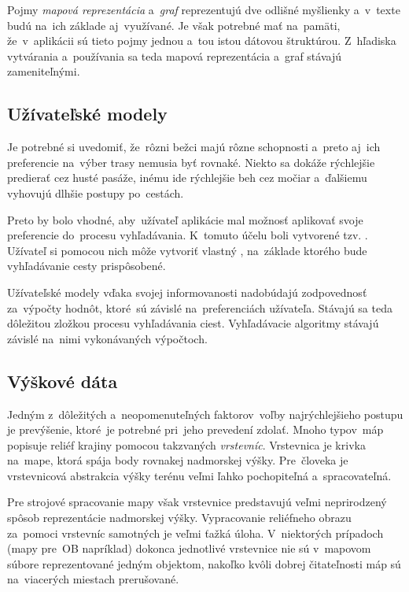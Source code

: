 Pojmy \textit{mapová reprezentácia} a~\textit{graf} reprezentujú dve odlišné myšlienky a~v~texte budú na~ich základe aj~využívané. Je však potrebné mať na~pamäti, že~v~aplikácii sú tieto pojmy jednou a~tou istou dátovou štruktúrou. Z~hľadiska vytvárania a~používania sa teda mapová reprezentácia a~graf stávajú zameniteľnými.

\subsection{Užívateľské modely}\label{uzivatelske_modely}

Je potrebné si uvedomiť, že~rôzni bežci majú rôzne schopnosti a~preto aj~ich preferencie na~výber trasy nemusia byť rovnaké. Niekto sa dokáže rýchlejšie predierať cez husté pasáže, inému ide rýchlejšie beh cez močiar a~ďalšiemu vyhovujú dlhšie postupy po~cestách. 

Preto by bolo vhodné, aby~užívateľ aplikácie mal možnosť aplikovať svoje preferencie do~procesu vyhľadávania. K~tomuto účelu boli vytvorené tzv. . Užívateľ si pomocou nich môže vytvoriť vlastný , na~základe ktorého bude vyhľadávanie cesty prispôsobené.

Užívateľské modely vďaka svojej informovanosti nadobúdajú zodpovednosť za~výpočty hodnôt, ktoré~sú závislé na~preferenciách užívateľa. Stávajú sa teda dôležitou zložkou procesu vyhľadávania ciest. Vyhľadávacie algoritmy stávajú závislé na~nimi vykonávaných výpočtoch.

\subsection{Výškové dáta}\label{vyskove_data}

Jedným z~dôležitých a~neopomenuteľných faktorov~voľby najrýchlejšieho postupu je prevýšenie, ktoré~je potrebné pri~jeho prevedení zdolať. Mnoho typov~máp popisuje reliéf krajiny pomocou takzvaných \textit{vrstevníc}. Vrstevnica je krivka na~mape, ktorá spája body rovnakej nadmorskej výšky. Pre~človeka je vrstevnicová abstrakcia výšky terénu veľmi ľahko pochopiteľná a~spracovateľná.

Pre strojové spracovanie mapy však vrstevnice predstavujú veľmi neprirodzený spôsob reprezentácie nadmorskej výšky. Vypracovanie reliéfneho obrazu za~pomoci vrstevníc samotných je veľmi ťažká úloha. V~niektorých prípadoch (mapy pre~OB napríklad) dokonca jednotlivé vrstevnice nie sú v~mapovom súbore reprezentované jedným objektom, nakoľko kvôli dobrej čitateľnosti máp sú na~viacerých miestach prerušované.

